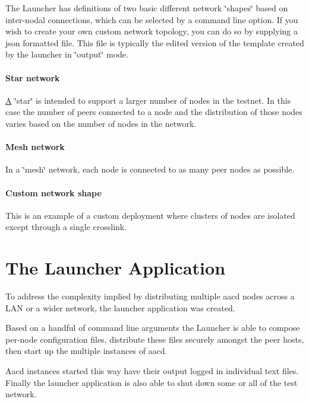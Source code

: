 The Launcher has definitions of two basic different network \char`\"{}shapes\char`\"{} based on inter-\/nodal connections, which can be selected by a command line option. If you wish to create your own custom network topology, you can do so by supplying a json formatted file. This file is typically the edited version of the template created by the launcher in \char`\"{}output\char`\"{} mode.

\paragraph*{Star network}

 \mbox{\hyperlink{struct_a}{A}} \char`\"{}star\char`\"{} is intended to support a larger number of nodes in the testnet. In this case the number of peers connected to a node and the distribution of those nodes varies based on the number of nodes in the network.

\paragraph*{Mesh network}

 In a \char`\"{}mesh\char`\"{} network, each node is connected to as many peer nodes as possible.

\paragraph*{Custom network shape}

 This is an example of a custom deployment where clusters of nodes are isolated except through a single crosslink.

\section*{The Launcher Application}

To address the complexity implied by distributing multiple aacd nodes across a L\+AN or a wider network, the launcher application was created.

Based on a handful of command line arguments the Launcher is able to compose per-\/node configuration files, distribute these files securely amongst the peer hosts, then start up the multiple instances of aacd.

Aacd instances started this way have their output logged in individual text files. Finally the launcher application is also able to shut down some or all of the test network.

